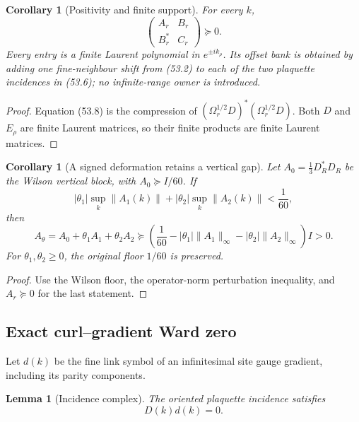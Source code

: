 \documentclass[11pt,oneside]{book}
\newtheorem{lemma}[theorem]{Lemma}
\newtheorem{corollary}[theorem]{Corollary}
\theoremstyle{definition}
\theoremstyle{remark}
\begin{document}
\begin{corollary}[Positivity and finite support]
\label{cor:e8v53-positive-local}
For every \(k\),
\[
 \begin{pmatrix}A_r&B_r\\B_r^*&C_r\end{pmatrix}\succeq0.      \tag{53.8}
\]
Every entry is a finite Laurent polynomial in
\(e^{\pm ik_\rho}\).  Its offset bank is obtained by adding one
fine-neighbour shift from (53.2) to each of the two plaquette
incidences in (53.6); no infinite-range owner is introduced.
\end{corollary}

\begin{proof}
Equation (53.8) is the compression of
\((\Omega_r^{1/2}D)^*(\Omega_r^{1/2}D)\).
Both \(D\) and \(E_\rho\) are finite Laurent matrices, so their
finite products are finite Laurent matrices.
\end{proof}

\begin{corollary}[A signed deformation retains a vertical gap]
\label{cor:e8v53-gap-chart}
Let \(A_0=\frac13D_R^*D_R\) be the Wilson vertical block, with
\(A_0\succeq I/60\).  If
\[
 |\theta_1|\sup_k\|A_1(k)\|
 +|\theta_2|\sup_k\|A_2(k)\|<\frac1{60},                      \tag{53.9}
\]
then
\[
 A_\theta=A_0+\theta_1A_1+\theta_2A_2
 \succeq
 \left(\frac1{60}
 -|\theta_1|\|A_1\|_\infty
 -|\theta_2|\|A_2\|_\infty\right)I>0.                         \tag{53.10}
\]
For \(\theta_1,\theta_2\ge0\), the original floor \(1/60\) is
preserved.
\end{corollary}

\begin{proof}
Use the Wilson floor, the operator-norm perturbation inequality,
and \(A_r\succeq0\) for the last statement.
\end{proof}

\subsection{Exact curl--gradient Ward zero}

Let \(d(k)\) be the fine link symbol of an infinitesimal site gauge
gradient, including its parity components.

\begin{lemma}[Incidence complex]
\label{lem:e8v53-incidence-complex}
The oriented plaquette incidence satisfies
\[
 D(k)d(k)=0.                                                  \tag{53.11}
\]
\end{lemma}
\end{document}
